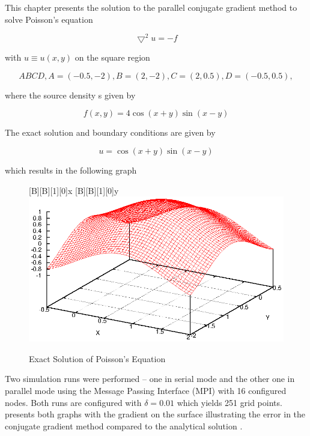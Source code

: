 \documentclass[12pt,a4paper]{report}
\begin{document}
This chapter presents the solution to the parallel conjugate gradient
method to solve Poisson's equation

\begin{equation}
  \label{eq:poisson}
  \bigtriangledown^{2}u=-f
\end{equation}

with $u\equiv u(x,y)$ on the square region

\begin{equation}
  \label{eq:squareRegion}
  ABCD, A=(-0.5,-2), B=(2,-2), C=(2,0.5), D=(-0.5,0.5),
\end{equation}

where the source density s given by

\begin{equation}
  \label{eq:sourceDensity}
  f(x,y)=4\cos(x+y)\sin(x-y)
\end{equation}

The exact solution and boundary conditions are given by

\begin{equation}
  \label{eq:boundaryCond}
  u=\cos(x+y)\sin(x-y)
\end{equation}

which results in the following graph

\begin{figure}[htb]
  \centering
  [B][B][1][0]{x}
  [B][B][1][0]{y}
  \includegraphics[scale=0.5]{./images/exact.eps}
  \caption{Exact Solution of Poisson's Equation}
  \label{fig:exactPoiss}
\end{figure}

Two simulation runs were performed -- one in serial mode and the other
one in parallel mode using the Message Passing Interface (MPI) with 16
configured nodes. Both runs are configured with $\delta=0.01$ which
yields 251 grid points.  presents both
graphs with the gradient on the surface illustrating the error
 in the conjugate gradient method compared to the
analytical solution .
\end{document}
